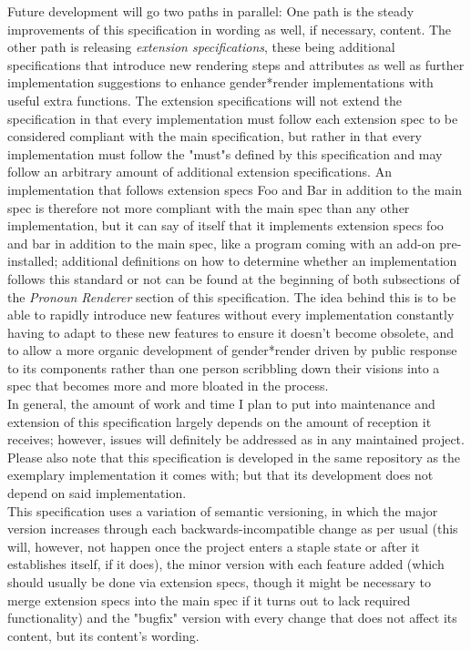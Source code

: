 \documentclass{article}
\newcommand{\GenderRender}{
    gender*render
}
\begin{document}
    Future development will go two paths in parallel: One path is the steady improvements of this specification in wording as well, if necessary, content.
    The other path is releasing \emph{extension specifications}, these being additional specifications that introduce new rendering steps and attributes as well as further implementation suggestions to enhance \GenderRender implementations with useful extra functions.
    The extension specifications will not extend the specification in that every implementation must follow each extension spec to be considered compliant with the main specification, but rather in that every implementation must follow the "must"s defined by this specification and may follow an arbitrary amount of additional extension specifications.
    An implementation that follows extension specs Foo and Bar in addition to the main spec is therefore not more compliant with the main spec than any other implementation, but it can say of itself that it implements extension specs foo and bar in addition to the main spec, like a program coming with an add-on pre-installed;
    additional definitions on how to determine whether an implementation follows this standard or not can be found at the beginning of both subsections of the \emph{Pronoun Renderer} section of this specification.
    The idea behind this is to be able to rapidly introduce new features without every implementation constantly having to adapt to these new features to ensure it doesn't become obsolete, and to allow a more organic development of \GenderRender driven by public response to its components rather than one person scribbling down their visions into a spec that becomes more and more bloated in the process.\\

    In general, the amount of work and time I plan to put into maintenance and extension of this specification largely depends on the amount of reception it receives;
    however, issues will definitely be addressed as in any maintained project.
    Please also note that this specification is developed in the same repository as the exemplary implementation it comes with;
    but that its development does not depend on said implementation.\\

    This specification uses a variation of semantic versioning, in which the major version increases through each backwards-incompatible change as per usual (this will, however, not happen once the project enters a staple state or after it establishes itself, if it does), the minor version with each feature added (which should usually be done via extension specs, though it might be necessary to merge extension specs into the main spec if it turns out to lack required functionality) and the "bugfix" version with every change that does not affect its content, but its content's wording.\\
\end{document}

